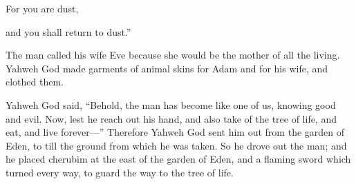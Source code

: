 {\par }{\Q For you are dust,
\par }{\QB and you shall return to dust.”
\par }{\PP {}The man called his wife Eve because she would be the mother of all the living.
Yahweh God made garments of animal skins for Adam and for his wife, and clothed them.
\par }{\PP {}Yahweh God said, “Behold, the man has become like one of us, knowing good and evil. Now, lest he reach out his hand, and also take of the tree of life, and eat, and live forever—”
Therefore Yahweh God sent him out from the garden of Eden, to till the ground from which he was taken.
So he drove out the man; and he placed cherubim at the east of the garden of Eden, and a flaming sword which turned every way, to guard the way to the tree of life.

}
